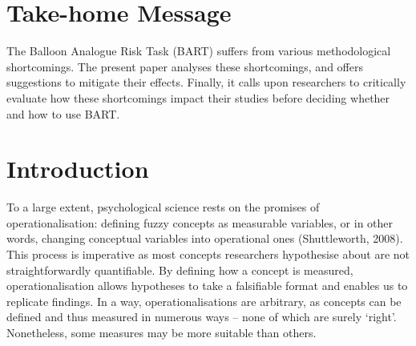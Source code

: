 \documentclass[serif, twocolumn, review]{jote-article}
\begin{document}
{}
\section*{Take-home Message}
The Balloon Analogue Risk Task (BART) suffers from various methodological shortcomings. The present paper analyses these shortcomings, and offers suggestions to mitigate their effects. Finally, it calls upon researchers to critically evaluate how these shortcomings impact their studies before deciding whether and how to use BART.

{}
\section*{Introduction}

To a large extent, psychological science rests on the promises of operationalisation: defining fuzzy concepts as measurable variables, or in other words, changing conceptual variables into operational ones (Shuttleworth, 2008). This process is imperative as most concepts researchers hypothesise about are not straightforwardly quantifiable. By defining how a concept is measured, operationalisation allows hypotheses to take a falsifiable format and enables us to replicate findings. In a way, operationalisations are arbitrary, as concepts can be defined and thus measured in numerous ways -- none of which are surely `right'. Nonetheless, some measures may be more suitable than others. 
\end{document}
